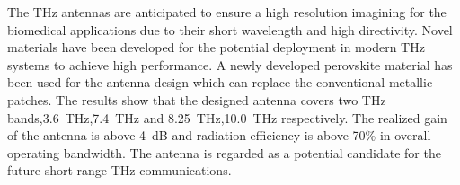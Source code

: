 \documentclass[12pt]{suhbook}
\begin{document}
The THz antennas are anticipated to ensure a high resolution imagining for the biomedical applications due to their short wavelength and high directivity. Novel materials have been developed for the potential deployment in modern THz systems to achieve high performance.  A newly developed perovskite material has been used for the antenna design which can replace the conventional metallic patches. The results show that the designed antenna covers two THz bands,\SI{3.6}{\THz},\SI{7.4}{\THz} and \SI{8.25}{\THz},\SI{10.0}{\THz} respectively. The realized gain of the antenna is above \SI{4 }{\dB} and radiation efficiency is above 70\% in overall operating bandwidth. The antenna is regarded as a potential candidate for the future short-range THz communications.


\end{document}
